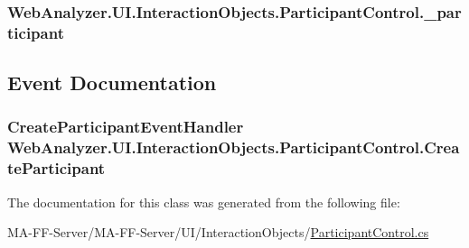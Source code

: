 \subsubsection[{\+\_\+participant}]{ Web\+Analyzer.\+U\+I.\+Interaction\+Objects.\+Participant\+Control.\+\_\+participant\hspace{0.3cm}{\ttfamily [private]}}\label{class_web_analyzer_1_1_u_i_1_1_interaction_objects_1_1_participant_control_ae7f805fadde2e1d9088c751bc5860b94}


\subsection{Event Documentation}
\hypertarget{class_web_analyzer_1_1_u_i_1_1_interaction_objects_1_1_participant_control_a05567dca7355e947bf348985f4227d36}{}
\subsubsection[{Create\+Participant}]{\setlength{\rightskip}{0pt plus 5cm}Create\+Participant\+Event\+Handler Web\+Analyzer.\+U\+I.\+Interaction\+Objects.\+Participant\+Control.\+Create\+Participant}\label{class_web_analyzer_1_1_u_i_1_1_interaction_objects_1_1_participant_control_a05567dca7355e947bf348985f4227d36}


The documentation for this class was generated from the following file\+:\begin{DoxyCompactItemize}
\item 
M\+A-\/\+F\+F-\/\+Server/\+M\+A-\/\+F\+F-\/\+Server/\+U\+I/\+Interaction\+Objects/\hyperlink{_participant_control_8cs}{Participant\+Control.\+cs}\end{DoxyCompactItemize}
